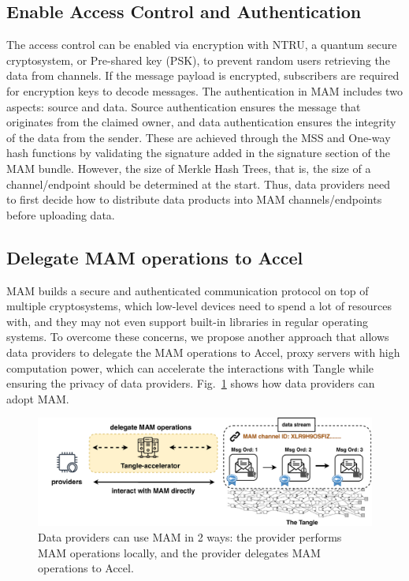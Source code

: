 \documentclass[10pt, conference, compsocconf]{IEEEtran}
\begin{document}
\subsection{Enable Access Control and Authentication}
\label{section:mam_features}
The access control can be enabled via encryption with NTRU\cite{NTRU}, a quantum secure cryptosystem, or Pre-shared key (PSK), to prevent random users retrieving the data from channels. If the message payload is encrypted, subscribers are required for encryption keys to decode messages. The authentication in MAM includes two aspects: source and data. Source authentication ensures the message that originates from the claimed owner, and data authentication ensures the integrity of the data from the sender. These are achieved through the MSS and One-way hash functions by validating the signature added in the signature section of the MAM bundle. However, the size of Merkle Hash Trees, that is, the size of a channel/endpoint should be determined at the start. Thus, data providers need to first decide how to distribute data products into MAM channels/endpoints before uploading data.

\subsection{Delegate MAM operations to Accel}
\label{section:ta_endpoint}
MAM builds a secure and authenticated communication protocol on top of multiple cryptosystems, which low-level devices need to spend a lot of resources with, and they may not even support built-in libraries in regular operating systems. To overcome these concerns, we propose another approach that allows data providers to delegate the MAM operations to Accel, proxy servers with high computation power, which can accelerate the interactions with Tangle while ensuring the privacy of data providers. Fig.~\ref{fig:delegation} shows how data providers can adopt MAM.

\begin{figure}[!t]
    \centering
    \includegraphics[width=\linewidth]{delegation}
    \caption{Data providers can use MAM in 2 ways: the provider performs MAM operations locally, and the provider delegates MAM operations to Accel.}
    \label{fig:delegation}
\end{figure}
\end{document}
